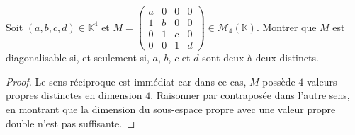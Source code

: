 \documentclass[french,a4paper]{article}
\newcommand{\K}{\mathbb{K}}
\theoremstyle{plain}
\theoremstyle{definition}
\theoremstyle{remark}
\begin{document}
\begin{ex}{}
	Soit $(a,b,c,d)\in\K^4$ et $M=\displaystyle\begin{pmatrix}
		a&0&0&0\\
		1&b&0&0\\
		0&1&c&0\\
		0&0&1&d
	\end{pmatrix}\in\mathcal{M}_4(\K)$. Montrer que $M$ est diagonalisable si, et seulement si, $a$, $b$, $c$ et $d$ sont deux à deux distincts.
\end{ex}
\begin{proof}
	Le sens réciproque est immédiat car dans ce cas, $M$ possède $4$ valeurs propres distinctes en dimension $4$. Raisonner par contraposée dans l'autre sens, en montrant que la dimension du sous-espace propre avec une valeur propre double n'est pas suffisante.
\end{proof}
\end{document}
